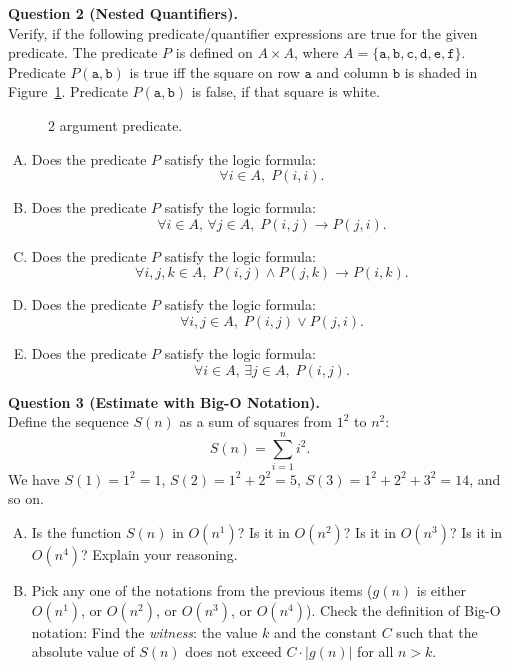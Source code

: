 \documentclass[jou]{apa6}
\begin{document}
\vspace{10pt}
{\bf Question 2 (Nested Quantifiers).}\\
Verify, if the following predicate/quantifier expressions are true for the given predicate. 
The predicate $P$ is defined on $A \times A$, where
$A = \{ \mathtt{a},\mathtt{b},\mathtt{c},\mathtt{d},\mathtt{e},\mathtt{f} \}$. 
Predicate $P(\mathtt{a},\mathtt{b})$ is true iff the square on row $\mathtt{a}$
and column $\mathtt{b}$ is shaded in Figure~\ref{fig:relation-set6}. Predicate $P(\mathtt{a},\mathtt{b})$ 
is false, if that square is white.
\begin{figure}[!htb]
\caption{\label{fig:relation-set6} 2 argument predicate.}
\end{figure}


\begin{enumerate}[(A)]
\item Does the predicate $P$ satisfy the logic formula:
$$\forall i \in A,\;P(i,i).$$
\item Does the predicate $P$ satisfy the logic formula:
$$\forall i \in A,\,\forall j \in A,\;P(i,j) \rightarrow P(j,i).$$
\item Does the predicate $P$ satisfy the logic formula:
$$\forall i,j,k \in A,\;P(i,j) \wedge P(j,k) \rightarrow P(i,k).$$
\item Does the predicate $P$ satisfy the logic formula:
$$\forall i,j \in A,\;P(i,j) \vee P(j,i).$$
\item Does the predicate $P$ satisfy the logic formula:
$$\forall i \in A,\, \exists j \in A,\;P(i,j).$$
\end{enumerate}

\vspace{10pt}
{\bf Question 3 (Estimate with Big-O Notation).}\\
Define the sequence $S(n)$ as a sum of squares from $1^2$ to $n^2$:
$$S(n) = \sum\limits_{i=1}^n i^2.$$
We have $S(1) = 1^2 = 1$, $S(2) = 1^2 + 2^2 = 5$, 
$S(3) = 1^2 + 2^2 + 3^2 = 14$,
and so on. 

\begin{enumerate}[(A)]
\item Is the function $S(n)$ in $O(n^1)$? 
Is it in $O(n^2)$? Is it in $O(n^3)$? Is it in $O(n^4)$? 
Explain your reasoning. 
\item Pick any one of the notations from the previous items 
($g(n)$ is either $O(n^1)$, or $O(n^2)$, or $O(n^3)$, or $O(n^4)$). 
Check the definition of Big-O notation: Find the {\em witness}: the value $k$ and the constant $C$
such that the absolute value of $S(n)$ does not exceed $C\cdot{}|g(n)|$ for all $n > k$.
\end{enumerate}
\end{document}
